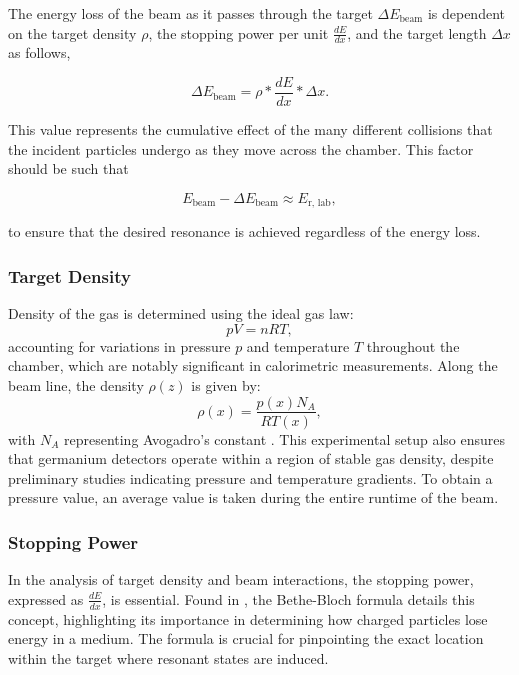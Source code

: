 \documentclass[a4paper,12pt]{article}
\begin{document}
The energy loss of the beam as it passes through the target $\Delta{E}_{\text{beam}}$ is dependent on the target density $\rho$, the stopping power per unit $\frac{dE}{dx}$, and the target length $\Delta{x}$ as follows,

\begin{equation}
    \Delta{E}_{\text{beam}} = \rho * \frac{dE}{dx} * \Delta{x}.
\end{equation}

This value represents the cumulative effect of the many different collisions that the incident particles undergo as they move across the chamber.  This factor should be such that

\begin{equation}
    E_{\text{beam}} - \Delta{E}_{\text{beam}} \approx E_{\text{r, lab}},
\end{equation}

to ensure that the desired resonance is achieved regardless of the energy loss.

\subsubsection{Target Density}\label{target density}

Density of the gas is determined using the ideal gas law:
\begin{equation}
pV = nRT,
\end{equation}
accounting for variations in pressure \( p \) and temperature \( T \) throughout the chamber, which are notably significant in calorimetric measurements. Along the beam line, the density \( \rho(z) \) is given by:
\begin{equation}
\rho(x) = \frac{p(x)N_A}{RT(x)},
\end{equation}
with \( N_A \) representing Avogadro's constant \cite{chiara}. This experimental setup also ensures that germanium detectors operate within a region of stable gas density, despite preliminary studies indicating pressure and temperature gradients.  To obtain a pressure value, an average value is taken during the entire runtime of the beam.   


\subsubsection{Stopping Power}

In the analysis of target density and beam interactions, the stopping power, expressed as \( \frac{dE}{dx} \), is essential. Found in \cite{leo1994}, the Bethe-Bloch formula details this concept, highlighting its importance in determining how charged particles lose energy in a medium. The formula is crucial for pinpointing the exact location within the target where resonant states are induced.
\end{document}
